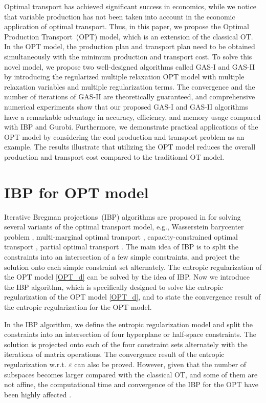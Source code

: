 \documentclass[review,hidelinks,onefignum,onetabnum]{siamart220329}
\begin{document}
Optimal transport has achieved significant success in economics, while we notice that variable production has not been taken into account in the economic application of optimal transport. Thus, in this paper, we propose the Optimal Production Transport~(OPT) model, which is an extension of the classical OT. In the OPT model, the production plan and transport plan need to be obtained simultaneously with the minimum production and transport cost. 
To solve this novel model, 
we propose two well-designed algorithms called GAS-I and GAS-II by introducing the regularized multiple relaxation OPT model with multiple relaxation variables and multiple regularization terms.
The convergence and the number of iterations of GAS-II are theoretically guaranteed, and comprehensive numerical experiments show that our proposed GAS-I and GAS-II algorithms have a remarkable advantage in accuracy, efficiency, and memory usage compared with IBP and Gurobi.
Furthermore, we demonstrate practical applications of the OPT model by considering the coal production and transport problem as an example. The results illustrate that utilizing the OPT model reduces the overall production and transport cost compared to the traditional OT model.






\newpage
\appendix
\section{IBP for OPT model} \label{sec:IBP}

Iterative Bregman projections~(IBP) algorithms are proposed in \cite{IBP} for solving several variants of the optimal transport model, e.g., Wasserstein barycenter problem \cite{agueh2011barycenters}, multi-marginal optimal transport \cite{pass2011uniqueness, pass2012local}, capacity-constrained optimal transport \cite{COT}, partial optimal transport \cite{POT}. The main idea of IBP is to split the constraints into an intersection of a few simple constraints, and project the solution onto each simple constraint set alternately. 
The entropic regularization of the OPT model \cref{OPT_d} can be solved by the idea of IBP.
Now we introduce the IBP algorithm, which is specifically designed to solve the entropic regularization of the OPT model \cref{OPT_d}, and to state the convergence result of the entropic regularization for the OPT model.


In the IBP algorithm, we define the entropic regularization model and split the constraints into an intersection of four hyperplane or half-space constraints. The solution is projected onto each of the four constraint sets alternately with the iterations of matrix operations. The convergence result of the entropic regularization w.r.t. $\varepsilon$ can also be proved. 
However, given that the number of subspaces becomes larger compared with the classical OT, and some of them are not affine, the computational time and convergence of the IBP for the OPT have been highly affected \cite{huang2021projection,su2019order}. 
\end{document}
